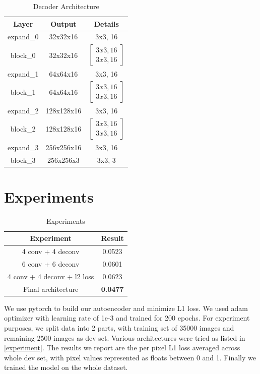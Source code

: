 \documentclass[11pt,a4paper]{article}
\begin{document}
\begin{table}[h]
\begin{center}
\begin{tabular}{|c|c|c|}
\hline \textbf{Layer} & \textbf{Output} & \textbf{Details} \\ \hline
expand\_0 & 32x32x16 & 3x3, 16 \\
block\_0 & 32x32x16 & 
$[\begin{array}{l}
    3x3, 16 \\
    3x3, 16
  \end{array}]$\\
  
expand\_1 & 64x64x16 & 3x3, 16 \\
block\_1 & 64x64x16 & 
$[\begin{array}{l}
    3x3, 16 \\
    3x3, 16
  \end{array}]$\\
  
expand\_2 & 128x128x16 & 3x3, 16 \\
block\_2 & 128x128x16 & 
$[\begin{array}{l}
    3x3, 16 \\
    3x3, 16
  \end{array}]$\\
  
expand\_3 & 256x256x16 & 3x3, 16 \\
block\_3 & 256x256x3 &  3x3, 3 \\
\hline
\end{tabular}
\end{center}
\caption{\label{decoder} Decoder Architecture }
\end{table}

\section{Experiments}

\begin{table}[h]
\begin{center}
\begin{tabular}{|c|c|}
\hline \textbf{Experiment} & \textbf{Result} \\ \hline
4 conv  + 4 deconv & 0.0523\\
6 conv + 6 deconv & 0.0601\\
4 conv  + 4 deconv + l2 loss & 0.0623\\
Final architecture & \textbf{0.0477}\\
\hline
\end{tabular}
\end{center}
\caption{\label{experiment} Experiments }
\end{table}
We use pytorch to build our autoencoder and minimize L1 loss. We used adam optimizer with learning rate of 1e-3 and trained for 200 epochs. For experiment purposes, we split data into 2 parts, with training set of 35000 images and remaining 2500 images as dev set. Various architectures were tried as listed in  \autoref{experiment}. The results we report are the per pixel L1 loss averaged across whole dev set, with pixel values represented as floats between 0 and 1. Finally we trained the model on the whole dataset.
\end{document}
